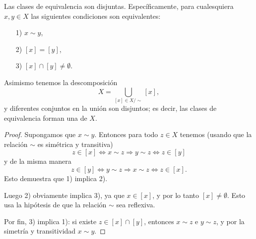 \begin{observacion}
  Las clases de equivalencia son disjuntas. Específicamente, para cualesquiera
  $x, y\in X$ las siguientes condiciones son equivalentes:
  \begin{enumerate}
  \item[1)] $x\sim y$,

  \item[2)] $[x] = [y]$,

  \item[3)] $[x] \cap [y] \ne \emptyset$.
  \end{enumerate}

  Asimismo tenemos la descomposición
  $$X = \bigcup_{[x] \in X/\!\!\sim} [x],$$
  y diferentes conjuntos en la unión son disjuntos; es decir, las clases de
  equivalencia forman una  de $X$.

  \begin{proof}
    Supongamos que $x\sim y$. Entonces para todo $z\in X$ tenemos (usando que la
    relación $\sim$ es simétrica y transitiva)
    $$z \in [x] \iff x\sim z \Longrightarrow y\sim z \iff z \in [y]$$
    y de la misma manera
    $$z \in [y] \iff y\sim z \Longrightarrow x\sim z \iff z \in [x].$$
    Esto demuestra que 1) implica 2).

    Luego 2) obviamente implica 3), ya que $x \in [x]$, y por lo tanto
    $[x] \ne \emptyset$. Esto usa la hipótesis de que la relación $\sim$ sea
    reflexiva.

    Por fin, 3) implica 1): si existe $z \in [x] \cap [y]$, entonces $x\sim z$ e
    $y\sim z$, y por la simetría y transitividad $x\sim y$.
  \end{proof}
\end{observacion}


